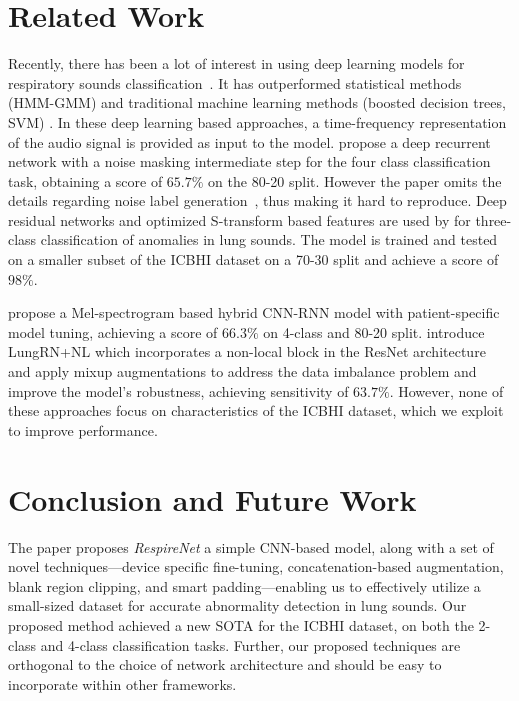 \documentclass{article}
\newcommand{\method}{\textit{RespireNet}}
\begin{document}
\section{Related Work}
\vspace{-2mm}
Recently, there has been a lot of interest in using deep learning models for respiratory sounds classification~\cite{acharya_20, lungrn_20, noise_rnn_koch_18}. It has outperformed statistical methods (HMM-GMM) \cite{jako_18} and traditional machine learning methods (boosted decision trees, SVM) \cite{chambres_18, serbes_18}. 
In these deep learning based approaches, a time-frequency representation of the audio signal is provided as input to the model. \citet{noise_rnn_koch_18} propose a deep recurrent network with a noise masking intermediate step for the four class classification task, obtaining a score of $65.7\%$ on the 80-20 split. However the paper omits the details regarding noise label generation~\cite{acharya_20},
thus making it hard to reproduce.
Deep residual networks and optimized S-transform based features are used by \citet{triple_class_chen_19} for three-class classification of anomalies in lung sounds. The model is trained and tested on a smaller subset of the ICBHI dataset on a 70-30 split and achieve a score of $98\%$.

\citet{acharya_20} propose a Mel-spectrogram based hybrid CNN-RNN model with patient-specific model tuning, achieving a score of $66.3\%$ on 4-class and 80-20 split. \citet{lungrn_20} introduce LungRN+NL which incorporates a non-local block in the ResNet architecture and apply mixup augmentations to address the data imbalance problem and improve the model's robustness, achieving sensitivity of $63.7\%$.
However, none of these approaches focus on characteristics of the ICBHI dataset, which we exploit to improve performance.
 \vspace{-2mm}
\section{Conclusion and Future Work}
\vspace{-2mm}

The paper proposes \method{} a simple CNN-based model, along with a set of novel techniques---device specific fine-tuning, concatenation-based augmentation, blank region clipping, and smart padding---enabling us to effectively utilize a small-sized dataset for accurate abnormality detection in lung sounds. Our proposed method achieved a new SOTA for the ICBHI dataset, on both the 2-class and 4-class classification tasks. Further, our proposed techniques are orthogonal to the choice of network architecture and should be easy to incorporate within other frameworks.
\end{document}
